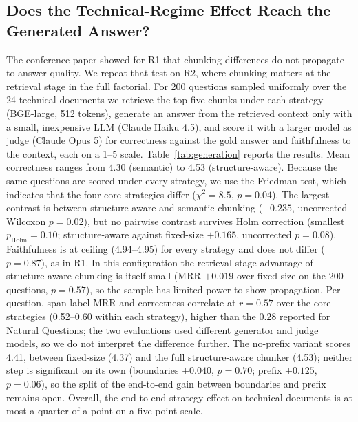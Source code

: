\documentclass[runningheads]{llncs}
\begin{document}
\subsection{Does the Technical-Regime Effect Reach the Generated Answer?}
\label{sec:generation}
The conference paper showed for R1 that chunking differences do not propagate to answer quality. We repeat that test on R2, where chunking matters at the retrieval stage in the full factorial. For 200 questions sampled uniformly over the 24 technical documents we retrieve the top five chunks under each strategy (BGE-large, 512 tokens), generate an answer from the retrieved context only with a small, inexpensive LLM (Claude Haiku 4.5), and score it with a larger model as judge (Claude Opus 5) for correctness against the gold answer and faithfulness to the context, each on a 1--5 scale. Table~\ref{tab:generation} reports the results. Mean correctness ranges from 4.30 (semantic) to 4.53 (structure-aware). Because the same questions are scored under every strategy, we use the Friedman test, which indicates that the four core strategies differ ($\chi^2=8.5$, $p=0.04$). The largest contrast is between structure-aware and semantic chunking ($+0.235$, uncorrected Wilcoxon $p=0.02$), but no pairwise contrast survives Holm correction (smallest $p_{\mathrm{Holm}}=0.10$; structure-aware against fixed-size $+0.165$, uncorrected $p=0.08$). Faithfulness is at ceiling (4.94--4.95) for every strategy and does not differ ($p=0.87$), as in R1. In this configuration the retrieval-stage advantage of structure-aware chunking is itself small (MRR $+0.019$ over fixed-size on the 200 questions, $p=0.57$), so the sample has limited power to show propagation. Per question, span-label MRR and correctness correlate at $r=0.57$ over the core strategies (0.52--0.60 within each strategy), higher than the $0.28$ reported for Natural Questions; the two evaluations used different generator and judge models, so we do not interpret the difference further. The no-prefix variant scores 4.41, between fixed-size (4.37) and the full structure-aware chunker (4.53); neither step is significant on its own (boundaries $+0.040$, $p=0.70$; prefix $+0.125$, $p=0.06$), so the split of the end-to-end gain between boundaries and prefix remains open. Overall, the end-to-end strategy effect on technical documents is at most a quarter of a point on a five-point scale.
\end{document}
